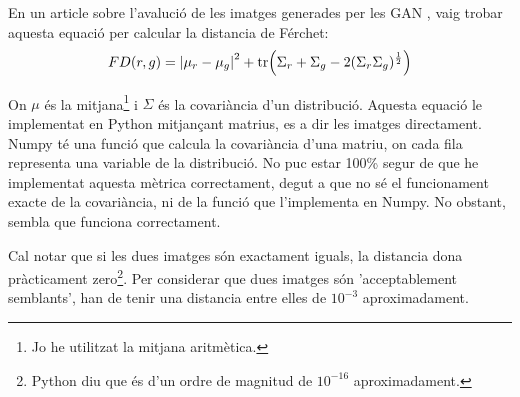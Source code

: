 En un article sobre l'avalució de les imatges generades per les GAN \cite{sd_score}, vaig trobar aquesta equació per calcular la distancia de Férchet:
$$
FD(r, g) = \abs{\mu_r - \mu_g}^2 + \tr(\Sigma_r + \Sigma_g -2(\Sigma_r\Sigma_g)^{\frac{1}{2}})
$$

On $\mu$ és la mitjana\footnote{Jo he utilitzat la mitjana aritmètica.} i $\Sigma$ és la covariància d'un distribució. Aquesta equació le implementat en Python mitjançant matrius, es a dir les imatges directament. Numpy té una funció que calcula la covariància d'una matriu, on cada fila representa una variable de la distribució. No puc estar 100\% segur de que he implementat aquesta mètrica correctament, degut a que no sé el funcionament exacte de la covariància, ni de la funció que l'implementa en Numpy. No obstant, sembla que funciona correctament. 

Cal notar que si les dues imatges són exactament iguals, la distancia dona pràcticament zero\footnote{Python diu que és d'un ordre de magnitud de $10^{-16}$ aproximadament.}. Per considerar que dues imatges són 'acceptablement semblants', han de tenir una distancia entre elles de $10^{-3}$ aproximadament. 